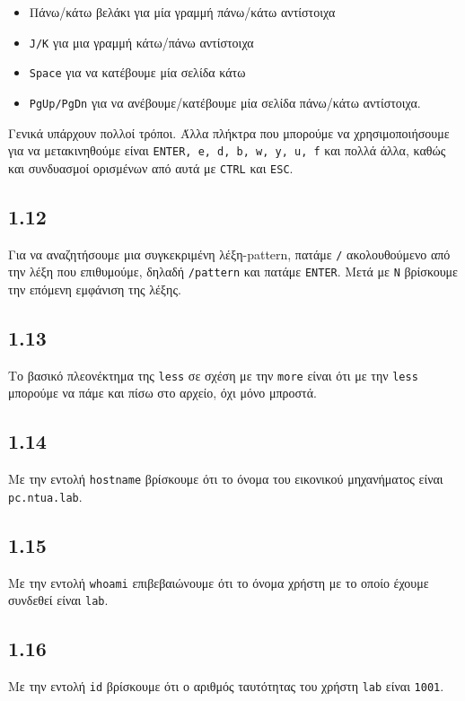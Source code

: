 \documentclass[a4paper, 12pt]{article}
\begin{document}
		\begin{itemize}
			\item Πάνω/κάτω βελάκι για μία γραμμή πάνω/κάτω αντίστοιχα
			\item \verb|J/K| για μια γραμμή κάτω/πάνω αντίστοιχα
			\item \verb|Space| για να κατέβουμε μία σελίδα κάτω
			\item \verb|PgUp/PgDn| για να ανέβουμε/κατέβουμε μία σελίδα πάνω/κάτω αντίστοιχα.
		\end{itemize}
		
		Γενικά υπάρχουν πολλοί τρόποι. Άλλα πλήκτρα που μπορούμε να χρησιμοποιήσουμε για να μετακινηθούμε είναι \verb|ENTER, e, d, b, w, y, u, f| και πολλά άλλα, καθώς και συνδυασμοί ορισμένων από αυτά με \verb|CTRL| και \verb|ESC|.
	
	\subsection*{1.12}
		Για να αναζητήσουμε μια συγκεκριμένη λέξη-pattern, πατάμε \verb|/| ακολουθούμενο από την λέξη που επιθυμούμε, δηλαδή \verb|/pattern| και πατάμε \verb|ENTER|. Μετά με \verb|N| βρίσκουμε την επόμενη εμφάνιση της λέξης.
			
	\subsection*{1.13}
		Το βασικό πλεονέκτημα της \verb|less| σε σχέση με την \verb|more| είναι ότι με την \verb|less| μπορούμε να πάμε και πίσω στο αρχείο, όχι μόνο μπροστά.
	
	\subsection*{1.14}
		Με την εντολή \verb|hostname| βρίσκουμε ότι το όνομα του εικονικού μηχανήματος είναι \verb|pc.ntua.lab|.
	
	\subsection*{1.15}
		Με την εντολή \verb|whoami| επιβεβαιώνουμε ότι το όνομα χρήστη με το οποίο έχουμε συνδεθεί είναι \verb|lab|.
	
	\subsection*{1.16}
	 	Με την εντολή \verb|id| βρίσκουμε ότι ο αριθμός ταυτότητας του χρήστη \verb|lab| είναι \verb|1001|.
	
\end{document}
